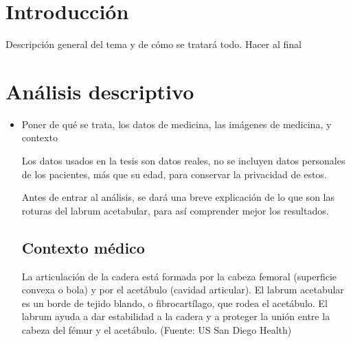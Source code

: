 \documentclass{book}
\begin{document}
	

	\section{Introducción}  
	Descripción general del tema y de cómo se tratará todo. Hacer al final
	
	\section{Análisis descriptivo} 
		\begin{itemize}
			\item Poner de qué se trata, los datos de medicina, las imágenes de medicina, y contexto
			
			Los datos usados en la tesis son datos reales, no se incluyen datos personales de los pacientes, más que su edad, para conservar la privacidad de estos. 
			
			
			
			Antes de entrar al análisis, se dará una breve explicación de lo que son las roturas del labrum acetabular, para así comprender mejor los resultados.
			
	        \subsection{Contexto médico}
	        La articulación de la cadera está formada por la cabeza femoral (superficie convexa o bola) y por el acetábulo (cavidad articular). El labrum acetabular es un borde de tejido blando, o fibrocartílago, que rodea el acetábulo. El labrum ayuda a dar estabilidad a la cadera y a proteger la unión entre la cabeza del fémur y el acetábulo. (Fuente: US San Diego Health) 
	        
	      

\end{itemize}
\end{document}
